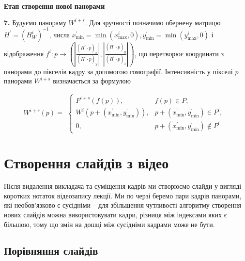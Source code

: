 \begin{algorithm}[H]
\begin{algorithmic}
        \textbf{Етап створення нової панорами}
        
        \textbf{7.}
        Будуємо панораму $W^{i+s}$. Для зручності позначимо обернену матрицю $H^{'} = (H_{W}^{i})^{-1}$, числа
        $x_{\min}^{'} = \min(x_{\max}^{i}, 0), y_{\min}^{'} = \min(y_{\max}^{i}, 0)$ і відображення
        $f^i: p \rightarrow
            (|\frac{(H^{'} \cdot p)_x}{(H^{'} \cdot p)_y}|, |\frac{(H^{'} \cdot p)_y}{(H^{'} \cdot p)_z}|)$, що перетворює
        координати з панорами до пікселів кадру за допомогою гомографії. Інтенсивність у пікселі $p$ панорами
        $W^{i+s}$ визначається за формулою

        \begin{equation}
            W^{i + s}(p) =
            \begin{gathered}
                \begin{cases}
                    F^{i + s}(f(p)),                            & f(p) \in P,                                    \\
                    W^{i}( p + ( x_{\min}^{'},y_{\min}^{'} ) ), & p + ( x_{\min}^{'},y_{\min}^{'} ) \in P^{i},   \\
                    0,                                          & p + ( x_{\min}^{'},y_{\min}^{'} ) \notin P^{i}
                \end{cases}
            \end{gathered}
        \end{equation}
    \end{algorithmic}
    \label{al:panorama_creating_algorithm}
\end{algorithm}

\section{Створення слайдів з відео}

Після видалення викладача та суміщення кадрів ми створюємо слайди у вигляді
коротких нотаток відеозапису лекції. Ми по черзі беремо пари кадрів панорами, які
необов'язково є сусідніми – для збільшення чутливості алгоритму створення нових
слайдів можна використовувати кадри, різниця між індексами яких є більшою, тому що
змін на дошці між сусідніми кадрами може не бути.


\subsection{Порівняння слайдів}


